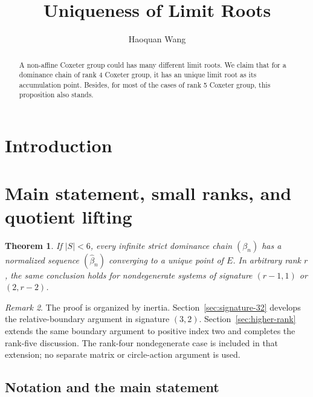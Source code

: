 \documentclass[11pt,reqno]{amsart}
\title[Uniqueness of Limit Roots]
{Uniqueness of Limit Roots}
\author{Haoquan Wang}
\theoremstyle{plain}
\newtheorem{theorem}{Theorem}[section]
\theoremstyle{definition}
\theoremstyle{remark}
\newtheorem{remark}[theorem]{Remark}
\numberwithin{equation}{section}
\begin{document}

\begin{abstract}
A non-affine Coxeter group could has many different limit roots. We claim that for a dominance chain of rank 4 Coxeter group, it has an unique limit root as its accumulation point. Besides, for most of the cases of rank 5 Coxeter group, this proposition also stands. 
\end{abstract}

\maketitle


\tableofcontents
\section{Introduction}
\label{sec:introduction}


\section{Main statement, small ranks, and quotient lifting}\label{sec:rank-four}
\begin{theorem}\label{thm:main}
If $|S|<6$, every infinite strict dominance chain $(\beta_n)$ has a normalized sequence $(\widehat{\beta}_n)$ converging to a unique point of $E$. In arbitrary rank $r$, the same conclusion holds for nondegenerate systems of signature $(r-1,1)$ or $(2,r-2)$.
\end{theorem}
\begin{remark}
The proof is organized by inertia. Section~\ref{sec:signature-32} develops the relative-boundary argument in signature $(3,2)$. Section~\ref{sec:higher-rank} extends the same boundary argument to positive index two and completes the rank-five discussion. The rank-four nondegenerate case is included in that extension; no separate matrix or circle-action argument is used.
\end{remark}

\subsection{Notation and the main statement}
\end{document}

